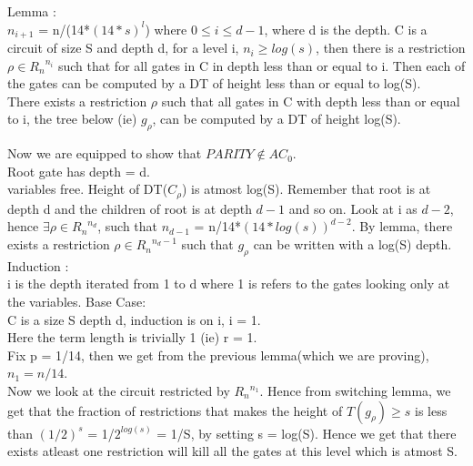 \documentclass[solution,addpoints,12pt]{exam}
\begin{document}
Lemma :\\
$n_{i+1}$ = n/(14*${(14*s)}^l$) where $ 0 \le i \le d-1$, where d is the depth.
C is a circuit of size S and depth d, for a level i, $n_i \ge log(s)$,
then there is a restriction $\rho \in {R_n}^{n_i}$ such that
for all gates in C in depth less than or equal to i. Then
each of the gates can be computed by a DT of height
less than or equal to log(S).\\

There exists a restriction $\rho$ such that all gates in C with depth
less than or equal to i, the tree below (ie) $g_{\rho}$, can be computed by a DT
of height log(S).

Now we are equipped to show that $PARITY \not \in AC_{0}$.\\
Root gate has depth = d.\\
variables free. Height of DT($C_{\rho}$) is atmost log(S).
Remember that root is at depth d and the children of root is
at depth $d-1$ and so on.
Look at i as $d-2$, hence
$\exists \rho \in {R_n}^{n_d}$, such that $n_{d-1}$ = n/14*${(14*log(s))}^{d-2}$.
By lemma, there exists a restriction $\rho \in {R_n}^{n_d - 1}$
such that $g_{\rho}$ can be written with a log(S) depth.\\

Induction :\\

i is the depth iterated from 1 to d where 1 is refers to the gates
looking only at the variables.
Base Case:\\
C is a size S depth d, induction is on i, i = 1.\\
Here the term length is trivially 1 (ie) r = 1.\\
Fix p = 1/14, then we get from the previous lemma(which we are proving),
$n_1 = n/14$.\\
Now we look at the circuit restricted by ${R_n}^{n_1}$.
Hence from switching lemma, we get that the fraction
of restrictions that makes the height of $T(g_{\rho}) \ge s$
is less than $(1/2)^s$ = 1/$2^{log(s)}$ = 1/S, by
setting s = log(S). Hence we get that there exists atleast
one restriction will kill all the gates at this level which is atmost
S.\\
\end{document}
